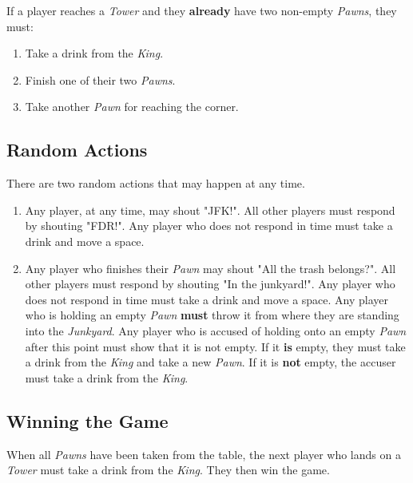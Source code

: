 \documentclass[12pt]{article}
\begin{document}
If a player reaches a \textit{Tower} and they \textbf{already} have two non-empty \textit{Pawns}, they must: \\

\begin{enumerate}
\item Take a drink from the \textit{King}.
\item Finish one of their two \textit{Pawns}.
\item Take another \textit{Pawn} for reaching the corner.
\end{enumerate}

\subsection{Random Actions}

There are two random actions that may happen at any time. \\

\begin{enumerate}
\item Any player, at any time, may shout "JFK!". All other players must respond by shouting "FDR!". Any player who does not respond in time must take a drink and move a space.
\item Any player who finishes their \textit{Pawn} may shout "All the trash belongs?". All other players must respond by shouting "In the junkyard!". Any player who does not respond in time must take a drink and move a space. Any player who is holding an empty \textit{Pawn} \textbf{must} throw it from where they are standing into the \textit{Junkyard}. Any player who is accused of holding onto an empty \textit{Pawn} after this point must show that it is not empty. If it \textbf{is} empty, they must take a drink from the \textit{King} and take a new \textit{Pawn}. If it is \textbf{not} empty, the accuser must take a drink from the \textit{King}.
\end{enumerate}

\subsection{Winning the Game}

When all \textit{Pawns} have been taken from the table, the next player who lands on a \textit{Tower} must take a drink from the \textit{King}. They then win the game. \\
\end{document}

